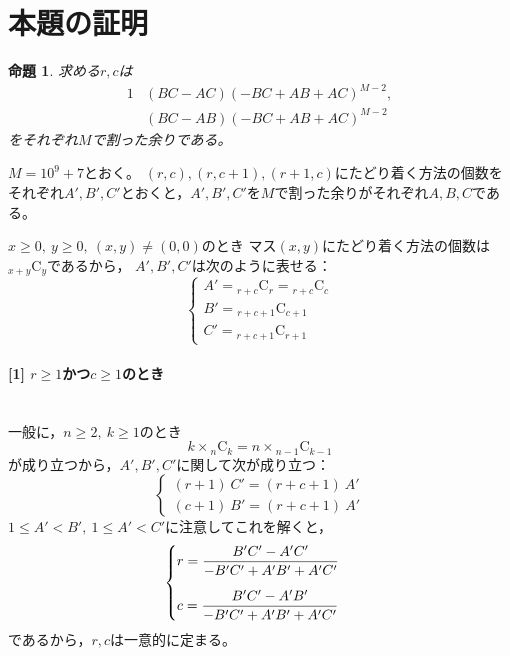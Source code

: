 \documentclass{article}
\makeatletter
\renewenvironment{proof}[1][\proofname]{\par
        \pushQED{\qed}
        \normalfont
        \topsep6\p@\@plus6\p@ \trivlist
        \item[\hskip\labelsep{\bfseries #1}\@addpunct{\bfseries}]\ignorespaces
    }{%
        \popQED\endtrivlist\@endpefalse
    }
\renewcommand{\proofname}{証明.}
\newtheorem{proposition}{命題}
\newcommand{\myparagraph}[1]{\paragraph{#1}\mbox{}\\}
\newcommand{\combination}[2]{{}_{#1} \mathrm{C}_{#2}}
\makeatother
\begin{document}
\section{本題の証明}

\begin{screen}
    \begin{proposition}
        \label{prop:main}
        求める$r, c$は
        \begin{alignat}{1}
            &(BC - AC)(-BC + AB + AC)^{M - 2}, \\
            &(BC - AB)(-BC + AB + AC)^{M - 2}
        \end{alignat}
        をそれぞれ$M$で割った余りである。
    \end{proposition}
\end{screen}

\begin{proof}
    $M = 10^9 + 7$とおく。
    $(r, c), (r, c + 1), (r + 1, c)$にたどり着く方法の個数を
    それぞれ$A', B', C'$とおくと，$A', B', C'$を$M$で割った余りがそれぞれ$A, B, C$である。

    $x \geq 0,\ y \geq 0,\ (x, y) \neq (0, 0)$のとき
    マス$(x, y)$にたどり着く方法の個数は$\combination{x + y}{y}$であるから，
    $A', B', C'$は次のように表せる：
    \begin{equation}
        \begin{cases}
            A' = \combination{r + c}{r} = \combination{r + c}{c} \\
            B' = \combination{r + c + 1}{c + 1} \\
            C' = \combination{r + c + 1}{r + 1}
        \end{cases}
    \end{equation}

    \myparagraph{[1] $r \geq 1$かつ$c \geq 1$のとき}

    一般に，$n \geq 2,\ k \geq 1$のとき
    \begin{equation}
        k \times \combination{n}{k} = n \times \combination{n - 1}{k - 1}
    \end{equation}
    が成り立つから，$A', B', C'$に関して次が成り立つ：
    \begin{equation}
        \begin{cases}
            (r + 1)\ C' = (r + c + 1)\ A' \\
            (c + 1)\ B' = (r + c + 1)\ A'
        \end{cases}
    \end{equation}
    $1 \leq A' < B',\ 1 \leq A' < C'$に注意してこれを解くと，
    \begin{equation}
        \begin{cases}
            \label{r_c}
            \vspace{10pt}
            r = \dfrac{B'C' - A'C'}{-B'C' + A'B' + A'C'} \\
            c = \dfrac{B'C' - A'B'}{-B'C' + A'B' + A'C'}
        \end{cases}
    \end{equation}
    であるから，$r, c$は一意的に定まる。


\end{proof}
\end{document}
